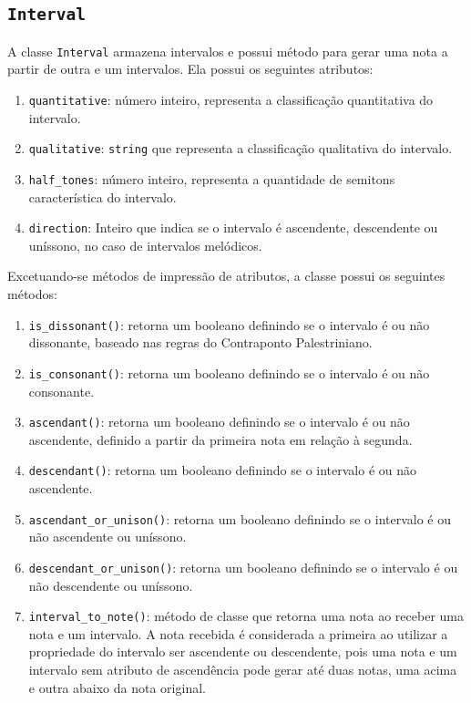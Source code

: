     \subsection[\texttt{Interval}]{\texttt{Interval}}

      A classe \texttt{Interval} armazena intervalos e possui método para gerar uma nota a partir de outra e um intervalos. Ela possui os seguintes atributos:

      \begin{enumerate}
        \item \texttt{quantitative}: número inteiro, representa a classificação quantitativa do intervalo.
        \item \texttt{qualitative}: \texttt{string} que representa a classificação qualitativa do intervalo.
        \item \texttt{half\_tones}: número inteiro, representa a quantidade de semitons característica do intervalo.
        \item \texttt{direction}: Inteiro que indica se o intervalo é ascendente, descendente ou uníssono, no caso de intervalos melódicos.
      \end{enumerate}

      Excetuando-se métodos de impressão de atributos, a classe possui os seguintes métodos:

      \begin{enumerate}
        \item \texttt{is\_dissonant()}: retorna um booleano definindo se o intervalo é ou não dissonante, baseado nas regras do Contraponto Palestriniano.
        \item \texttt{is\_consonant()}: retorna um booleano definindo se o intervalo é ou não consonante.
        \item \texttt{ascendant()}: retorna um booleano definindo se o intervalo é ou não ascendente, definido a partir da primeira nota em relação à segunda.
        \item \texttt{descendant()}: retorna um booleano definindo se o intervalo é ou não ascendente.
        \item \texttt{ascendant\_or\_unison()}: retorna um booleano definindo se o intervalo é ou não ascendente ou uníssono.
        \item \texttt{descendant\_or\_unison()}: retorna um booleano definindo se o intervalo é ou não descendente ou uníssono.
        \item \texttt{interval\_to\_note()}: método de classe que retorna uma nota ao receber uma nota e um intervalo. A nota recebida é considerada a primeira ao utilizar a propriedade do intervalo ser ascendente ou descendente, pois uma nota e um intervalo sem atributo de ascendência pode gerar até duas notas, uma acima e outra abaixo da nota original.
      \end{enumerate}

